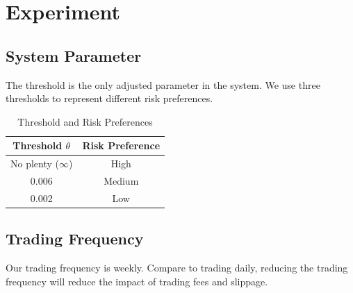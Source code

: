 \section{Experiment}

\subsection{System Parameter}
The threshold is the only adjusted parameter in the system.
We use three thresholds to represent different risk preferences.  
\begin{table}[htb]
    \centering
    \begin{tabular}{||c|c||}
    \hline \hline
    Threshold $\theta$ & Risk Preference \\ \hline
    No plenty ($\infty$) & High \\ \hline
    0.006 & Medium      \\ \hline
    0.002 & Low      \\ \hline \hline
    \end{tabular}
    \caption{Threshold and Risk Preferences}
    \label{tab:threshold}
\end{table}
\subsection{Trading Frequency}
Our trading frequency is weekly. Compare to trading daily, reducing the trading frequency will reduce the impact of trading fees and slippage.

